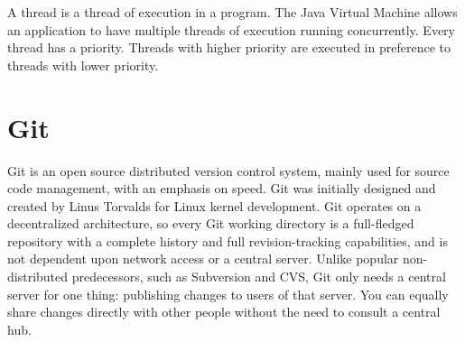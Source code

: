 \noindent
A thread is a thread of execution in a program.
The Java Virtual Machine allows an application to have multiple threads of execution running
concurrently.
Every thread has a priority.
Threads with higher priority are executed in preference to threads with lower priority.


\section{Git}\label{sec:git}
Git is an open source distributed version control system, mainly used for source code
management, with an emphasis on speed.
Git was initially designed and created by Linus Torvalds for Linux kernel development.
Git operates on a decentralized architecture, so every Git working directory is a
full-fledged repository with a complete history and full revision-tracking capabilities,
and is not dependent upon network access or a central server.
Unlike popular non-distributed predecessors, such as Subversion and CVS, Git only needs a
central server for one thing: publishing changes to users of that server.
You can equally share changes directly with other people without the need to consult a central hub. \citep{lifeguard2017}

%
%


